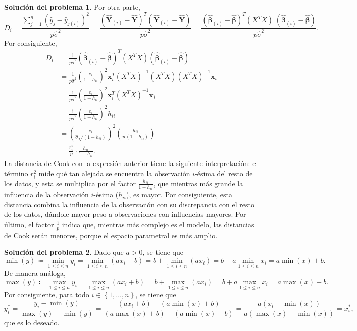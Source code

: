 \documentclass[twoside,12pt]{article}
\theoremstyle{definition}
\newtheorem{soln}{Solución del problema}
\begin{document}
\begin{soln}
Por otra parte,
\[
D_i = \frac{\sum_{j=1}^{n} {\left(\hat{y}_j-\hat{y}_{j(i)}\right)}^2}{p\hat{\sigma}^2} =\frac{\left(\widehat{\boldsymbol{Y}}_{(i)}-\widehat{\boldsymbol{Y}}\right)^{T}\left(\widehat{\boldsymbol{Y}}_{(i)}-\widehat{\boldsymbol{Y}}\right)}{p\hat{\sigma}^2} = \frac{(\widehat{\boldsymbol{\beta}}_{(i)}-\widehat{\boldsymbol{\beta}})^{T}(X^{T}X)\; (\widehat{\boldsymbol{\beta}}_{(i)}-\widehat{\boldsymbol{\beta}})}{p\hat{\sigma}^2}.
\]
Por consiguiente,
\[
\begin{split}
  D_i&= \frac{1}{p\hat{\sigma}^2}(\widehat{\boldsymbol{\beta}}_{(i)}-\widehat{\boldsymbol{\beta}})^{T}(X^{T}X)(\widehat{\boldsymbol{\beta}}_{(i)}-\widehat{\boldsymbol{\beta}})\\
  &= \frac{1}{p\hat{\sigma}^2}\left(\frac{e_i}{1-h_{ii}}\right)^2\boldsymbol{x}_i^{T}(X^{T}X)^{-1}(X^{T}X)(X^{T}X)^{-1}\boldsymbol{x}_i\\
  &= \frac{1}{p\hat{\sigma}^2}\left(\frac{e_i}{1-h_{ii}}\right)^2\boldsymbol{x}_i^{T}(X^{T}X)^{-1}\boldsymbol{x}_i\\
  &= \frac{1}{p\hat{\sigma}^2}\left(\frac{e_i}{1-h_{ii}}\right)^2h_{ii}\\
  &= \left( \frac{e_i}{\hat{\sigma}\sqrt{(1-h_{ii})}} \right)^2\left(\frac{h_{ii}}{p\,(1-h_{ii})}\right)\\
  &= \frac{r_i^2}{p} \cdot \frac{h_{ii}}{1-h_{ii}}.
\end{split}
\]
La distancia de Cook con la expresión anterior tiene la siguiente interpretación: el término $r_i^2$ mide qué tan alejada se encuentra la observación $i$-ésima del resto de los datos, y esta se multiplica por el factor $\frac{h_{ii}}{1-h_{ii}}$, que mientras más grande la influencia de la observación $i$-ésima ($h_{ii}$), es mayor. Por consiguiente, esta distancia combina la influencia de la observación con su discrepancia con el resto de los datos, dándole mayor peso a observaciones con influencias mayores. Por último, el factor $\frac{1}{p}$ indica que, mientras más complejo es el modelo, las distancias de Cook serán menores, porque el espacio parametral es más amplio.
\end{soln}

\newpage
\begin{soln}
Dado que $a>0$, se tiene que
\[
\min(y)\coloneqq \min_{1\leq i\leq n} y_i=\min_{1\leq i\leq n}(ax_i+b) = b+\min_{1\leq i\leq n}(ax_i) = b+a\min_{1\leq i\leq n} x_i = a\min(x)+b.
\]
De manera análoga,
\[
\max(y)\coloneqq \max_{1\leq i\leq n} y_i=\max_{1\leq i\leq n}(ax_i+b) = b+\max_{1\leq i\leq n}(ax_i) = b+a\max_{1\leq i\leq n} x_i =a\max(x)+b.
\]
Por consiguiente, para todo $i\in \left\lbrace 1, \ldots, n \right\rbrace$, se tiene que
\[
y_i^* = \frac{y_i-\min(y)}{\max(y)-\min(y)} = \frac{\left(ax_i+b\right)-\left(a\min(x)+b\right)}{\left(a\max(x)+b\right)-\left(a\min(x)+b\right)} = \frac{a\left(x_i-\min(x)\right)}{a\left(\max(x)-\min(x)\right)} = x_i^*,
\]
que es lo deseado.
\end{soln}
\end{document}
